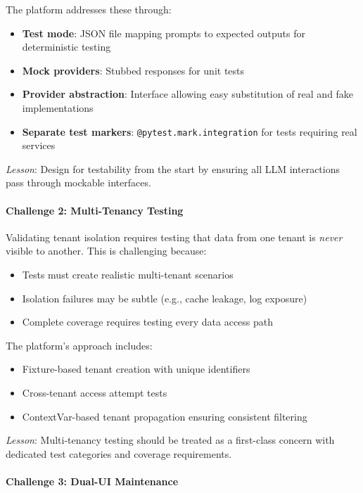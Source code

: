 The platform addresses these through:
\begin{itemize}
    \item \textbf{Test mode}: JSON file mapping prompts to expected outputs for deterministic testing
    \item \textbf{Mock providers}: Stubbed responses for unit tests
    \item \textbf{Provider abstraction}: Interface allowing easy substitution of real and fake implementations
    \item \textbf{Separate test markers}: \texttt{@pytest.mark.integration} for tests requiring real services
\end{itemize}

\textit{Lesson}: Design for testability from the start by ensuring all LLM interactions pass through mockable interfaces.

\paragraph{Challenge 2: Multi-Tenancy Testing}

Validating tenant isolation requires testing that data from one tenant is \textit{never} visible to another. This is challenging because:

\begin{itemize}
    \item Tests must create realistic multi-tenant scenarios
    \item Isolation failures may be subtle (e.g., cache leakage, log exposure)
    \item Complete coverage requires testing every data access path
\end{itemize}

The platform's approach includes:
\begin{itemize}
    \item Fixture-based tenant creation with unique identifiers
    \item Cross-tenant access attempt tests
    \item ContextVar-based tenant propagation ensuring consistent filtering
\end{itemize}

\textit{Lesson}: Multi-tenancy testing should be treated as a first-class concern with dedicated test categories and coverage requirements.

\paragraph{Challenge 3: Dual-UI Maintenance}

